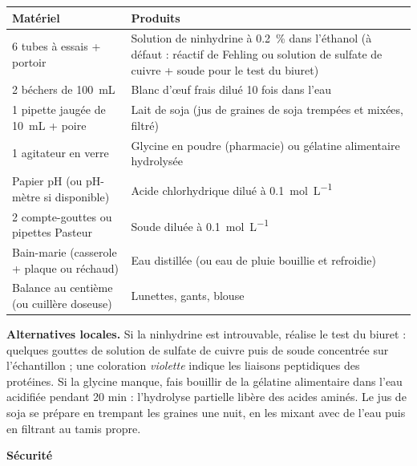 \documentclass[11pt]{article}
\newcommand{\cle}[1]{{\popxbold\color{popdark}#1}}
\begin{document}
\begin{center}
\begin{tabularx}{\linewidth}{|l|X|}
\hline
\rowcolor{popblueL} \textbf{Matériel} & \textbf{Produits} \\
\hline
6 tubes à essais + portoir & Solution de ninhydrine à \SI{0,2}{\%} dans l'éthanol (à défaut : réactif de Fehling ou solution de sulfate de cuivre + soude pour le test du biuret) \\
\hline
2 béchers de \SI{100}{mL} & Blanc d'œuf frais dilué 10 fois dans l'eau \\
\hline
1 pipette jaugée de \SI{10}{mL} + poire & Lait de soja (jus de graines de soja trempées et mixées, filtré) \\
\hline
1 agitateur en verre & Glycine en poudre (pharmacie) ou gélatine alimentaire hydrolysée \\
\hline
Papier pH (ou pH-mètre si disponible) & Acide chlorhydrique dilué à \SI{0,1}{mol.L^{-1}} \\
\hline
2 compte-gouttes ou pipettes Pasteur & Soude diluée à \SI{0,1}{mol.L^{-1}} \\
\hline
Bain-marie (casserole + plaque ou réchaud) & Eau distillée (ou eau de pluie bouillie et refroidie) \\
\hline
Balance au centième (ou cuillère doseuse) & Lunettes, gants, blouse \\
\hline
\end{tabularx}
\end{center}

\textbf{Alternatives locales.} Si la ninhydrine est introuvable, réalise le \cle{test du biuret} : quelques gouttes de solution de sulfate de cuivre  puis de soude concentrée sur l'échantillon ; une coloration \emph{violette} indique les liaisons peptidiques des protéines. Si la glycine manque, fais bouillir de la gélatine alimentaire dans l'eau acidifiée pendant 20 min : l'hydrolyse partielle libère des acides aminés. Le jus de soja se prépare en trempant les graines une nuit, en les mixant avec de l'eau puis en filtrant au tamis propre.

\textbf{Sécurité}\par
\end{document}
